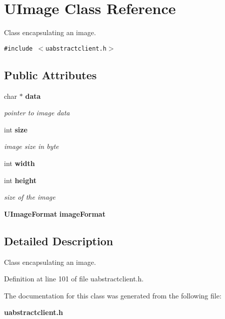 \section{UImage Class Reference}
\label{classUImage}
Class encapsulating an image.  


{\tt \#include $<$uabstractclient.h$>$}

\subsection*{Public Attributes}
\begin{CompactItemize}
\item 
char $\ast$ {\bf data}\label{classUImage_o0}

\begin{CompactList}\small\item\em pointer to image data \item\end{CompactList}\item 
int {\bf size}\label{classUImage_o1}

\begin{CompactList}\small\item\em image size in byte \item\end{CompactList}\item 
int {\bf width}\label{classUImage_o2}

\item 
int {\bf height}\label{classUImage_o3}

\begin{CompactList}\small\item\em size of the image \item\end{CompactList}\item 
{\bf UImage\-Format} {\bf image\-Format}\label{classUImage_o4}

\end{CompactItemize}


\subsection{Detailed Description}
Class encapsulating an image. 



Definition at line 101 of file uabstractclient.h.

The documentation for this class was generated from the following file:\begin{CompactItemize}
\item 
{\bf uabstractclient.h}\end{CompactItemize}
